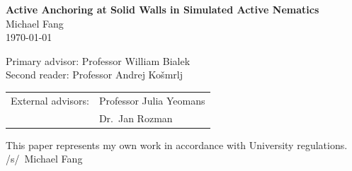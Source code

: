 \documentclass[11pt]{article}
\begin{document}
\begin{center}
  {\Large \textbf{Active Anchoring at Solid Walls in Simulated Active Nematics}}\\[2ex]
  Michael Fang \\
  \today
\end{center}

\noindent
{\small
\begin{minipage}{\textwidth}
\centering

\begin{minipage}[t]{0.44\textwidth}\vspace{0pt}
Primary advisor: Professor William Bialek\\
Second reader: Professor Andrej Košmrlj\\
\begin{tabular}[t]{@{}l@{\ }l@{}}
External advisors: & Professor Julia Yeomans\\
                  & Dr.\ Jan Rozman
\end{tabular}
\end{minipage}
\hspace{0.04\textwidth}%
\begin{minipage}[t]{0.40\textwidth}\vspace{0pt}
\raggedleft
This paper represents my own work in accordance with University regulations.\\
/s/\ Michael Fang
\end{minipage}

\end{minipage}
}
\vspace{-0.2cm}

\begin{abstract}
Active nematics exhibit distinct orientation patterns near boundaries, where activity generates shear flows that select preferred director alignments. We study this active anchoring phenomenon using continuum theory and hybrid lattice-Boltzmann simulations implemented in Ludwig. Starting from the Stokes and Leslie--Ericksen framework for nemato-hydrodynamics, we first review how active stresses, flow-alignment, and elasticity affect stable orientations at active-passive boundaries. We then analytically determine how active anchoring occurs at solid walls and test these predictions by simulating two-dimensional active nematic systems. Our simulated results reproduce the theoretical selection of planar anchoring in extensile systems and homeotropic anchoring in contractile systems, and show how increasing the flow-alignment parameter shifts the stable director angle at solid boundaries from active anchoring towards a well-defined Leslie angle relative to the flow. By measuring the depth of active anchoring away from the boundary walls, we also confirm that the predicted penetration depth of active anchoring is proportional to the characteristic active length scale $l_\text{act} \sim \sqrt{\kappa / |\zeta |}$. These results provide a direct numerical test of solid-wall active anchoring in confined active nematics.

\end{abstract}
\end{document}
